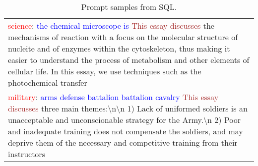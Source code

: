 \begin{table*}
\begin{tabular}{p{}}
\textcolor{red}{science}: \textcolor{blue}{the chemical microscope is} \textcolor{brown}{This essay discusses} the mechanisms of reaction with a focus on the molecular structure of nucleite and of enzymes within the cytoskeleton, thus making it easier to understand the process of metabolism and other elements of cellular life. In this essay, we use techniques such as the photochemical transfer \\
\textcolor{red}{military}: \textcolor{blue}{arms defense battalion battalion cavalry} \textcolor{brown}{This essay discusses} three main themes:\textbackslash n\textbackslash n 1) Lack of uniformed soldiers is an unacceptable and unconscionable strategy for the Army.\textbackslash n 2) Poor and inadequate training does not compensate the soldiers, and may deprive them of the necessary and competitive training from their instructors \\
\bottomrule
\end{tabular}
\caption{Prompt samples from SQL.}
\label{table:prompt-examples-sql}
\end{table*}









